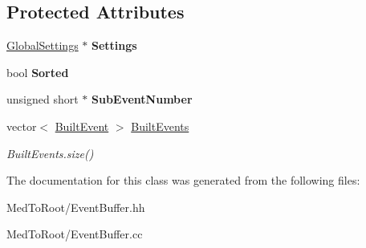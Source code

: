 \subsection*{Protected Attributes}
\begin{DoxyCompactItemize}
\item 
\mbox{\label{class_event_buffer_a0c7ee1b008d8ff909977d6c38c010923}} 
\hyperlink{class_global_settings}{Global\+Settings} $\ast$ {\bfseries Settings}
\item 
\mbox{\label{class_event_buffer_ad495f17af4b84135789a21ed0109a239}} 
bool {\bfseries Sorted}
\item 
\mbox{\label{class_event_buffer_a0427cf345d5e88932b754966c21535e1}} 
unsigned short $\ast$ {\bfseries Sub\+Event\+Number}
\item 
\mbox{\label{class_event_buffer_a18101f4a449fbf92fa3c946b0924fb10}} 
vector$<$ \hyperlink{class_built_event}{Built\+Event} $>$ \hyperlink{class_event_buffer_a18101f4a449fbf92fa3c946b0924fb10}{Built\+Events}
\begin{DoxyCompactList}\small\item\em Built\+Events.\+size() \end{DoxyCompactList}\end{DoxyCompactItemize}


The documentation for this class was generated from the following files\+:\begin{DoxyCompactItemize}
\item 
Med\+To\+Root/Event\+Buffer.\+hh\item 
Med\+To\+Root/Event\+Buffer.\+cc\end{DoxyCompactItemize}
